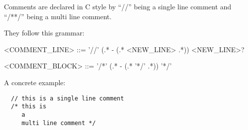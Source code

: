 Comments are declared in C style by \enquote{//} being a single line comment and \enquote{/**/} being a multi line comment.

They follow this grammar:

\begin{grammar}
  <COMMENT\_LINE> ::= '//' (.* - (.* <NEW\_LINE> .*)) <NEW\_LINE>?
\end{grammar}
\begin{grammar}
  <COMMENT\_BLOCK> ::= '/*' (.* - (.* '*/' .*)) '*/'
\end{grammar}

A concrete example:

\begin{verbatim}
  // this is a single line comment
  /* this is
     a
     multi line comment */
\end{verbatim}
